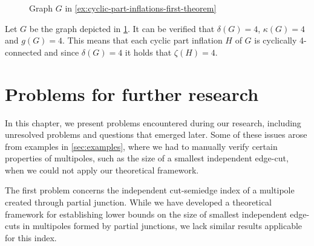 \documentclass[12pt, twoside]{book}
\begin{document}
\begin{example}\label{ex:cyclic-part-inflations-first-theorem}
	\begin{figure}
		\centering
		\caption{Graph $G$ in \cref{ex:cyclic-part-inflations-first-theorem}}
		\label{fig:cyclic-part-inflations-ex-2-before}
	\end{figure}

	Let $G$ be the graph depicted in \cref{fig:cyclic-part-inflations-ex-2-before}. It can be verified that $\delta(G)=4$, $\kappa(G)=4$ and $g(G)=4$. This means that each cyclic part inflation $H$ of $G$ is cyclically 4-connected and since $\delta(G)=4$ it holds that $\zeta(H)=4$.
\end{example}


\chapter{Problems for further research}\label{ch:problems-for-research}

In this chapter, we present problems encountered during our research, including unresolved problems and questions that emerged later. Some of these issues arose from examples in \cref{sec:examples}, where we had to manually verify certain properties of multipoles, such as the size of a smallest independent edge-cut, when we could not apply our theoretical framework.

The first problem concerns the independent cut-semiedge index of a multipole created through partial junction. While we have developed a theoretical framework for establishing lower bounds on the size of smallest independent edge-cuts in multipoles formed by partial junctions, we lack similar results applicable for this index.
\end{document}
